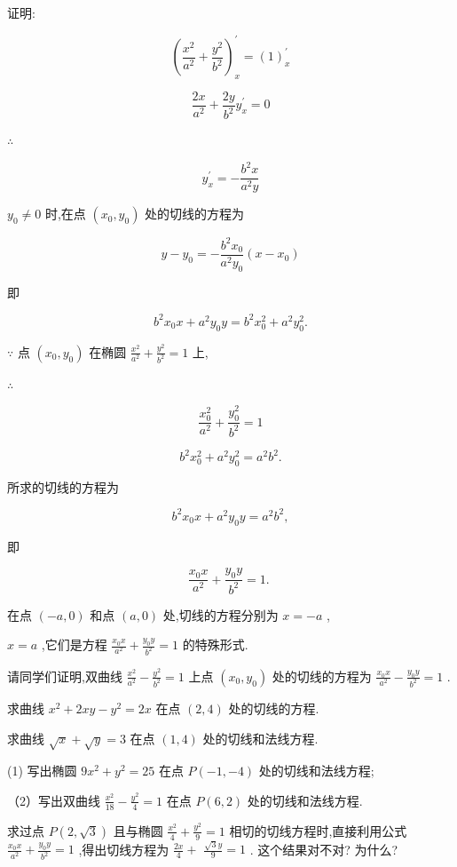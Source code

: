 \documentclass[lang=cn,newtx,10pt,scheme=chinese]{elegantbook}
\begin{document}
证明:

\[
{\left( \frac{{x}^{2}}{{a}^{2}} + \frac{{y}^{2}}{{b}^{2}}\right) }_{x}^{\prime } = {\left( 1\right) }_{x}^{\prime }
\]

\[
\frac{2x}{{a}^{2}} + \frac{2y}{{b}^{2}}{y}_{x}^{\prime } = 0
\]

\(\therefore\)

\[
{y}_{x}^{\prime } = - \frac{{b}^{2}x}{{a}^{2}y}
\]

\({y}_{0} \neq 0\) 时,在点 \(\left( {{x}_{0},{y}_{0}}\right)\) 处的切线的方程为

\[
y - {y}_{0} = - \frac{{b}^{2}{x}_{0}}{{a}^{2}{y}_{0}}\left( {x - {x}_{0}}\right)
\]

即

\[
{b}^{2}{x}_{0}x + {a}^{2}{y}_{0}y = {b}^{2}{x}_{0}^{2} + {a}^{2}{y}_{0}^{2}.
\]

\(\because\) 点 \(\left( {{x}_{0},{y}_{0}}\right)\) 在椭圆 \(\frac{{x}^{2}}{{a}^{2}} + \frac{{y}^{2}}{{b}^{2}} = 1\) 上,

\(\therefore\)

\[
\frac{{x}_{0}^{2}}{{a}^{2}} + \frac{{y}_{0}^{2}}{{b}^{2}} = 1
\]

\[
{b}^{2}{x}_{0}^{2} + {a}^{2}{y}_{0}^{2} = {a}^{2}{b}^{2}.
\]

所求的切线的方程为

\[
{b}^{2}{x}_{0}x + {a}^{2}{y}_{0}y = {a}^{2}{b}^{2},
\]

即

\[
\frac{{x}_{0}x}{{a}^{2}} + \frac{{y}_{0}y}{{b}^{2}} = 1\text{. }
\]

在点 \(\left( {-a,0}\right)\) 和点 \(\left( {a,0}\right)\) 处,切线的方程分别为 \(x = - a\) ,

\(x = a\) ,它们是方程 \(\frac{{x}_{0}x}{{a}^{2}} + \frac{{y}_{0}y}{{b}^{2}} = 1\) 的特殊形式.

请同学们证明,双曲线 \(\frac{{x}^{2}}{{a}^{2}} - \frac{{y}^{2}}{{b}^{2}} = 1\) 上点 \(\left( {{x}_{0},{y}_{0}}\right)\) 处的切线的方程为 \(\frac{{x}_{0}x}{{a}^{2}} - \frac{{y}_{0}y}{{b}^{2}} = 1\) .

\begin{problemset}[练习]

\item 求曲线 \({x}^{2} + {2xy} - {y}^{2} = {2x}\) 在点 \(\left( {2,4}\right)\) 处的切线的方程.

\item 求曲线 \(\sqrt{x} + \sqrt{y} = 3\) 在点 \(\left( {1,4}\right)\) 处的切线和法线方程.

\item (1) 写出椭圆 \(9{x}^{2} + {y}^{2} = {25}\) 在点 \(P\left( {-1, - 4}\right)\) 处的切线和法线方程;

（2）写出双曲线 \(\frac{{x}^{2}}{18} - \frac{{y}^{2}}{4} = 1\) 在点 \(P\left( {6,2}\right)\) 处的切线和法线方程.

\item 求过点 \(P\left( {2,\sqrt{3}}\right)\) 且与椭圆 \(\frac{{x}^{2}}{4} + \frac{{y}^{2}}{9} = 1\) 相切的切线方程时,直接利用公式 \(\frac{{x}_{0}x}{{a}^{2}} + \frac{{y}_{0}y}{{b}^{2}} = 1\) ,得出切线方程为 \(\frac{2x}{4} +\) \(\frac{\sqrt{3}y}{9} = 1\) . 这个结果对不对? 为什么?

\end{problemset}
\end{document}
